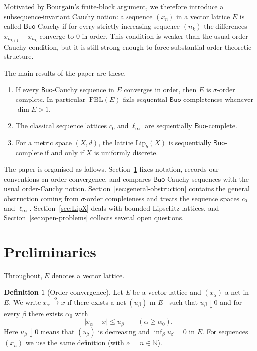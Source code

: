 \documentclass[11pt]{amsart}
\theoremstyle{definition}
\newtheorem{definition}[theorem]{Definition}
\newcommand{\N}{\mathbb{N}}
\newcommand{\Buo}{\ensuremath{\mathsf{Buo}}}
\renewcommand{\le}{\leqslant}
\renewcommand{\ge}{\geqslant}
\begin{document}
Motivated by Bourgain's finite-block argument, we therefore introduce a
subsequence-invariant Cauchy notion: a sequence $(x_n)$ in a vector lattice $E$
is called \Buo-Cauchy if for every strictly increasing sequence $(n_k)$ the
differences $x_{n_{k+1}}-x_{n_k}$ converge to $0$ in order.  This condition is
weaker than the usual order-Cauchy condition, but it is still strong enough to
force substantial order-theoretic structure.

The main results of the paper are these.
\begin{enumerate}[label=(\roman*)]
\item If every \Buo-Cauchy sequence in $E$ converges in order, then $E$ is
$\sigma$-order complete.  In particular, $\mathrm{FBL}(E)$ fails sequential
\Buo-completeness whenever $\dim E>1$.
\item The classical sequence lattices $c_0$ and $\ell_\infty$ are sequentially
\Buo-complete.
\item For a metric space $(X,d)$, the lattice $\mathrm{Lip}_b(X)$ is
sequentially \Buo-complete if and only if $X$ is uniformly discrete.
\end{enumerate}

The paper is organised as follows.  Section~\ref{sec:preliminaries} fixes
notation, records our conventions on order convergence, and compares
\Buo-Cauchy sequences with the usual order-Cauchy notion.
Section~\ref{sec:general-obstruction} contains the general obstruction coming
from $\sigma$-order completeness and treats the sequence spaces $c_0$ and
$\ell_\infty$.  Section~\ref{sec:LipX} deals with bounded Lipschitz lattices,
and Section~\ref{sec:open-problems} collects several open questions.

\section{Preliminaries}\label{sec:preliminaries}

Throughout, $E$ denotes a vector lattice.

\begin{definition}[Order convergence]\label{def:order_convergence}
Let $E$ be a vector lattice and $(x_\alpha)$ a net in $E$.
We write $x_\alpha\xrightarrow{\mathrm{o}}x$ if there exists a net $(u_\beta)$ in $E_+$
such that $u_\beta\downarrow 0$ and for every $\beta$ there exists $\alpha_0$ with
\[
|x_\alpha-x|\le u_\beta \qquad(\alpha\ge \alpha_0).
\]
Here $u_\beta\downarrow 0$ means that $(u_\beta)$ is decreasing and $\inf_\beta u_\beta=0$ in $E$.
For sequences $(x_n)$ we use the same definition (with $\alpha=n\in\N$).
\end{definition}
\end{document}
